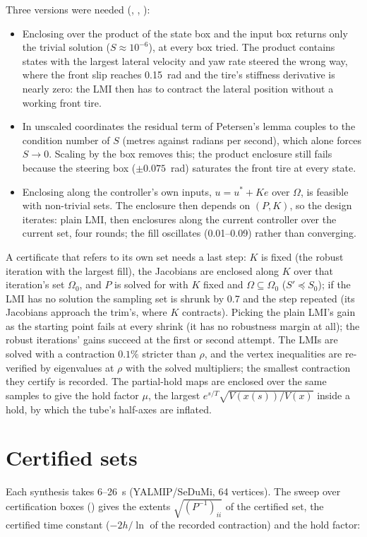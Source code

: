 \documentclass[11pt]{article}
\begin{document}
Three versions were needed (,
, ):
\begin{itemize}
\item Enclosing over the product of the state box and the input box returns
  only the trivial solution ($S\approx10^{-6}$), at every box tried. The
  product contains states with the largest lateral velocity and yaw rate
  steered the wrong way, where the front slip reaches 0.15~rad and the tire's
  stiffness derivative is nearly zero: the LMI then has to contract the
  lateral position without a working front tire.
\item In unscaled coordinates the residual term of Petersen's lemma couples
  to the condition number of $S$ (metres against radians per second), which
  alone forces $S\to0$. Scaling by the box removes this; the product
  enclosure still fails because the steering box ($\pm0.075$~rad) saturates
  the front tire at every state.
\item Enclosing along the controller's own inputs, $u=u^*+Ke$ over
  $\Omega$, is feasible with non-trivial sets. The enclosure then depends on
  $(P,K)$, so the design iterates: plain LMI, then enclosures along the
  current controller over the current set, four rounds; the fill oscillates
  (0.01--0.09) rather than converging.
\end{itemize}
A certificate that refers to its own set needs a last step: $K$ is fixed
(the robust iteration with the largest fill), the Jacobians are enclosed
along $K$ over that iteration's set $\Omega_0$, and $P$ is solved for with
$K$ fixed and $\Omega\subseteq\Omega_0$ ($S'\preceq S_0$); if the LMI has no
solution the sampling set is shrunk by 0.7 and the step repeated (its
Jacobians approach the trim's, where $K$ contracts). Picking the plain LMI's
gain as the starting point fails at every shrink (it has no robustness
margin at all); the robust iterations' gains succeed at the first or second
attempt. The LMIs are solved with a contraction $0.1\%$ stricter than
$\rho$, and the vertex inequalities are re-verified by eigenvalues at $\rho$
with the solved multipliers; the smallest contraction they certify is
recorded. The partial-hold maps are enclosed over the same samples to give
the hold factor $\mu$, the largest $e^{s/T}\sqrt{V(x(s))/V(x)}$ inside a
hold, by which the tube's half-axes are inflated.

\section{Certified sets}
Each synthesis takes 6--26~s (YALMIP/SeDuMi, 64 vertices). The sweep over
certification boxes () gives the extents
$\sqrt{(P^{-1})_{ii}}$ of the certified set, the certified time constant
($-2h/\ln$ of the recorded contraction) and the hold factor:
\end{document}
